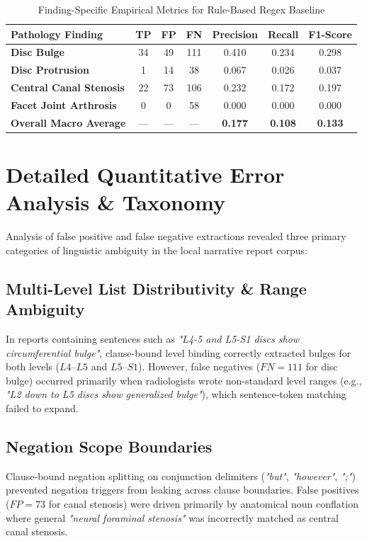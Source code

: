 \begin{table}[htbp]
\centering
\caption{Finding-Specific Empirical Metrics for Rule-Based Regex Baseline}
\label{tab:finding_specific}
\begin{tabular}{lcccccc}
\toprule
\textbf{Pathology Finding} & \textbf{TP} & \textbf{FP} & \textbf{FN} & \textbf{Precision} & \textbf{Recall} & \textbf{F1-Score} \\
\midrule
\textbf{Disc Bulge} & 34 & 49 & 111 & 0.410 & 0.234 & 0.298 \\
\textbf{Disc Protrusion} & 1 & 14 & 38 & 0.067 & 0.026 & 0.037 \\
\textbf{Central Canal Stenosis} & 22 & 73 & 106 & 0.232 & 0.172 & 0.197 \\
\textbf{Facet Joint Arthrosis} & 0 & 0 & 58 & 0.000 & 0.000 & 0.000 \\
\midrule
\textbf{Overall Macro Average} & --- & --- & --- & \textbf{0.177} & \textbf{0.108} & \textbf{0.133} \\
\bottomrule
\end{tabular}
\end{table}

\section{Detailed Quantitative Error Analysis \& Taxonomy}
Analysis of false positive and false negative extractions revealed three primary categories of linguistic ambiguity in the local narrative report corpus:

\subsection{Multi-Level List Distributivity \& Range Ambiguity}
In reports containing sentences such as \textit{"L4-5 and L5-S1 discs show circumferential bulge"}, clause-bound level binding correctly extracted bulges for both levels ($L4$--$L5$ and $L5$--$S1$). However, false negatives ($FN = 111$ for disc bulge) occurred primarily when radiologists wrote non-standard level ranges (e.g., \textit{"L2 down to L5 discs show generalized bulge"}), which sentence-token matching failed to expand.

\subsection{Negation Scope Boundaries}
Clause-bound negation splitting on conjunction delimiters (\textit{"but"}, \textit{"however"}, \textit{";"}) prevented negation triggers from leaking across clause boundaries. False positives ($FP = 73$ for canal stenosis) were driven primarily by anatomical noun conflation where general \textit{"neural foraminal stenosis"} was incorrectly matched as central canal stenosis.

